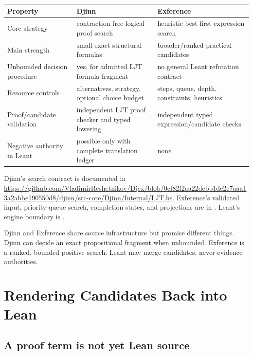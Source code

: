 \documentclass[10pt,letterpaper,oneside,openany]{report}
\begin{document}
\begin{center}
\begin{tabularx}{\textwidth}{@{}l X X@{}}
\toprule
Property & Djinn & Exference \\
\midrule
Core strategy & contraction-free logical proof search & heuristic best-first expression search \\
Main strength & small exact structural formulas & broader/ranked practical candidates \\
Unbounded decision procedure & yes, for admitted LJT formula fragment & no general Leant refutation contract \\
Resource controls & alternatives, strategy, optional choice budget & steps, queue, depth, constraints, heuristics \\
Proof/candidate validation & independent LJT proof checker and typed lowering & independent typed expression/candidate checks \\
Negative authority in Leant & possible only with complete translation ledger & none \\
\bottomrule
\end{tabularx}
\end{center}

\begin{sourcebox}
Djinn's search contract is documented in \url{https://github.com/VladimirReshetnikov/Djex/blob/0cf82f2aa22debb1de2c7aaa13a2abbe190550d8/djinn/src-core/Djinn/Internal/LJT.hs}.  Exference's validated input, priority-queue search, completion states, and projections are in .  Leant's engine boundary is .
\end{sourcebox}

\begin{recapbox}
Djinn and Exference share source infrastructure but promise different things.  Djinn can decide an exact propositional fragment when unbounded.  Exference is a ranked, bounded positive search.  Leant may merge candidates, never evidence authorities.
\end{recapbox}

\chapter{Rendering Candidates Back into Lean}\label{ch:rendering}

\section{A proof term is not yet Lean source}
\end{document}
